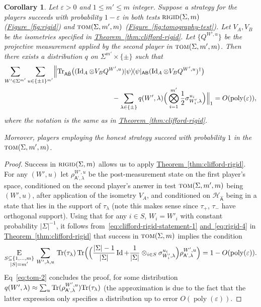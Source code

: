 \documentclass[11pt]{article}
\numberwithin{equation}{section}
\newtheorem{corollary}[theorem]{Corollary}
\theoremstyle{definition}
\theoremstyle{plain}
\newcommand{\expref}[2]{\hyperref[#2]{#1~\ref{#2}}}
\newcommand{\expeqref}[2]{\hyperref[#2]{#1~\eqref{#2}}}
\newcommand{\ket}[1]{|#1\rangle}
\newcommand{\bra}[1]{\langle#1|}
\newcommand{\proj}[1]{\ket{#1}\!\bra{#1}}
\newcommand{\Tr}{\mbox{\rm Tr}}
\newcommand{\Id}{\ensuremath{\mathop{\rm Id}\nolimits}}
\newcommand{\Es}[1]{\ensuremath{\mathop{\textsc{E}}}_{#1}} %
\DeclareMathOperator{\poly}{poly}
\newcommand{\reg}[1]{{\textsf{#1}}}
\newcommand{\mH}{\mathcal{H}}
\newcommand{\eps}{\varepsilon}
\newcommand{\rigid}{\textsc{rigid}}
\newcommand{\tom}{\textsc{tom}}
\begin{document}
\begin{corollary}\label{cor:clifford-rigid-adaptive}
Let $\eps>0$ and $1\leq m'\leq m$ integer. Suppose a strategy for the players
  succeeds with probability $1-\eps$ in both tests $\rigid(\Sigma,m)$
  (\expref{Figure}{fig:rigid}) and $\tom(\Sigma,m',m)$
  (\expref{Figure}{fig:tomography-test}). Let $V_A,V_B$ be the isometries specified
  in \expref{Theorem}{thm:clifford-rigid}. Let $\{Q^{W',u}\}$ be the projective
  measurement applied by the second player in $\tom(\Sigma,m',m)$. Then there exists a distribution $q$ on $\Sigma^{m'} \times \{\pm \}$ such that 
\begin{align*}
 \sum_{W'\in\Sigma^{m'}} \sum_{u\in\{\pm1\}^{m'}} &\Big\| \Tr_{\reg{A}\hat{\reg{B}}} \big((\Id_A \otimes V_B Q^{W',u} )\proj{\psi}_{\reg{AB}} (\Id_A \otimes V_B Q^{W',u})^\dagger\big)\\
&\hskip3cm - \sum_{\lambda\in\{\pm\}}  q(W',\lambda)  \Big( \bigotimes_{i=1}^{m'} \frac{1}{2}\sigma_{W'_i,\lambda}^{u_i}\Big) \Big\|_1 = O(\poly(\eps)),
\end{align*}
where the notation is the same as in \expref{Theorem}{thm:clifford-rigid}. 

Moreover, players employing the honest strategy succeed with probability $1$ in the
 $\tom(\Sigma,m',m)$.
\end{corollary}

\begin{proof}
Success in $\rigid(\Sigma,m)$ allows us to apply \expref{Theorem}{thm:clifford-rigid}. For any $(W',u)$ let $\rho_{\reg{A'},\lambda}^{W',u}$ be the post-measurement state on the first player's space, conditioned on the second player's answer  in test $\tom(\Sigma,m',m)$ being $(W',u)$, after application of the isometry $V_A$, and conditioned on $\mH_{\hat{\reg{A}}}$ being in a state that lies in the support of $\tau_\lambda$ (note this makes sense since $\tau_+$, $\tau_-$ have orthogonal support). 
Using that for any $i\in S$, $W_i=W'_i$ with constant probability $|\Sigma|^{-1}$, 
it follows from~\eqref{eq:clifford-rigid-statement-1} \expeqref{and}{eq:rigid-4} in \expref{Theorem}{thm:clifford-rigid} that success in $\tom(\Sigma,m)$ implies the condition
\begin{equation}\label{eq:tom-2}
\Es{\substack{S\subseteq \{1,\ldots,m\}\\|S|=m'}}\, \sum_{W',\lambda,u}\,\Tr(\tau_\lambda)  \,\Tr\Big(\Big( \frac{|\Sigma|-1}{|\Sigma|}\Id + \frac{1}{|\Sigma|}\otimes_{i\in S}\sigma_{W'_i,\lambda}^{u_i} \Big) \rho_{\reg{A'},\lambda}^{W',u}\Big)  = 1- O(\poly(\eps)). 
\end{equation}
Eq~\eqref{eq:tom-2} concludes the proof, for some distribution $q(W',\lambda) \approx \sum_u \Tr(\rho_{\reg{A'},\lambda}^{W',u})\Tr(\tau_\lambda)$ (the approximation is due to the fact that the latter expression only specifies a distribution up to error $O(\poly(\eps))$.
\end{proof}
\end{document}
